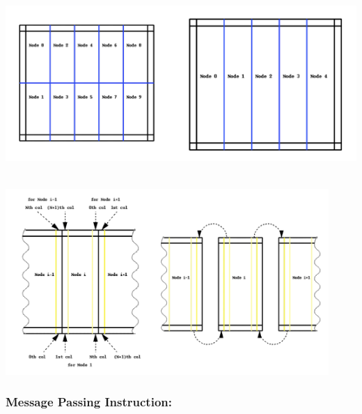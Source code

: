 \noindent
\begin{minipage}{\textwidth}
\begin{minipage}{.98\textwidth}
  \centering
  \includegraphics[height=200pt]{pics/node1}
  \label{fig:node1}
\end{minipage}%
\hfill
\begin{minipage}{.98\textwidth}
  \centering
  \includegraphics[height=200pt]{pics/node2}
  \label{fig:node2}
\end{minipage}
\end{minipage}
\vspace{0.1cm}






\subsubsection*{Message Passing Instruction:}

